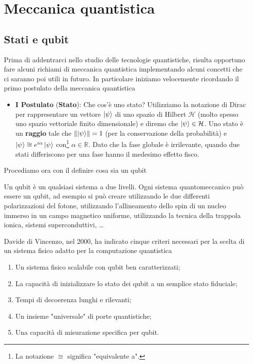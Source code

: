 
\chapter{Meccanica quantistica}

\section{Stati e qubit}
Prima di addentrarci nello studio delle tecnologie quantistiche, risulta opportuno fare alcuni richiami di meccanica quantistica implementando alcuni concetti che ci saranno poi utili in futuro. In particolare iniziamo velocemente ricordando il primo postulato della meccanica quantistica
\begin{itemize}
    \item \textbf{I Postulato} (\textbf{Stato}): Che cos'è uno stato? Utilizziamo la notazione di Dirac per rappresentare un vettore $\ket{\psi}$ di uno spazio di Hilbert $\mathcal{H}$ (molto spesso uno spazio vettoriale finito dimensionale) e diremo che $\ket{\psi} \in \mathcal{H}$. Uno stato è un \textbf{raggio} tale che $\norm{\ket{\psi}} = 1$ (per la conservazione della probabilità) e $\ket{\psi} \cong e^{i \alpha} \ket{\psi}$ con\footnote{La notazione $\cong$ significa "equivalente a".} $\alpha \in \mathbb{R}$. Dato che la fase globale è irrilevante, quando due stati differiscono per una fase hanno il medesimo effetto fisco. 
\end{itemize}
Procediamo ora con il definire cosa sia un qubit
\begin{definizione}
    Un qubit è un qualsiasi sistema a due livelli. Ogni sistema quantomeccanico può essere un qubit, ad esempio si può creare utilizzando le due differenti polarizzazioni del fotone, utilizzando l’allineamento dello spin di un nucleo immerso in un campo magnetico uniforme, utilizzando la tecnica della trappola ionica, sistemi superconduttivi, \dots
\end{definizione}
\noindent Davide di Vincenzo, nel 2000, ha indicato cinque criteri necessari per la scelta di un sistema fisico adatto per la computazione quantistica
\begin{enumerate}
    \item Un sistema fisico scalabile con qubit ben caratterizzati;
    \item La capacità di inizializzare lo stato dei qubit a un semplice stato fiduciale;
    \item Tempi di decoerenza lunghi e rilevanti;
    \item Un insieme "universale" di porte quantistiche;
    \item Una capacità di misurazione specifica per qubit.
\end{enumerate}
